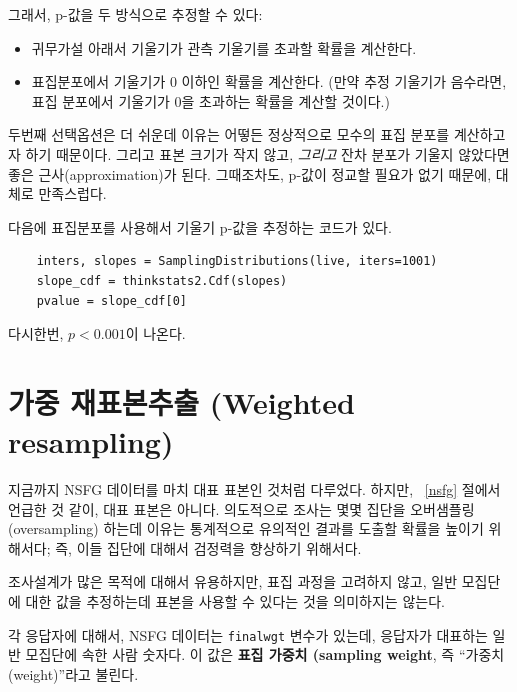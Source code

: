 그래서, p-값을 두 방식으로 추정할 수 있다:

\begin{itemize}

\item 귀무가설 아래서 기울기가 관측 기울기를 초과할 확률을 계산한다.

\item 표집분포에서 기울기가 0 이하인 확률을 계산한다. (만약 추정 기울기가 음수라면, 표집 분포에서 기울기가 0을 초과하는 확률을 계산할 것이다.)

\end{itemize}

두번째 선택옵션은 더 쉬운데 이유는 어떻든 정상적으로 모수의 표집 분포를 계산하고자 하기 때문이다. 그리고 표본 크기가 작지 않고, {\em 그리고} 잔차 분포가 기울지 않았다면 좋은 근사(approximation)가 된다. 그때조차도, p-값이 정교할 필요가 없기 때문에, 대체로 만족스럽다.


다음에 표집분포를 사용해서 기울기 p-값을 추정하는 코드가 있다.

\begin{verbatim}
    inters, slopes = SamplingDistributions(live, iters=1001)
    slope_cdf = thinkstats2.Cdf(slopes)
    pvalue = slope_cdf[0]
\end{verbatim}

다시한번, $p < 0.001$이 나온다.  


\section{가중 재표본추출 (Weighted resampling)}
\label{weighted}

지금까지 NSFG 데이터를 마치 대표 표본인 것처럼 다루었다. 하지만, ~\ref{nsfg} 절에서 언급한 것 같이, 대표 표본은 아니다. 의도적으로 조사는 몇몇 집단을 오버샘플링(oversampling) 하는데 이유는 통계적으로 유의적인 결과를 도출할 확률을 높이기 위해서다; 즉, 이들 집단에 대해서 검정력을 향상하기 위해서다.

조사설계가 많은 목적에 대해서 유용하지만, 표집 과정을 고려하지 않고, 일반 모집단에 대한 값을 추정하는데 표본을 사용할 수 있다는 것을 의미하지는 않는다.

각 응답자에 대해서, NSFG 데이터는 {\tt finalwgt} 변수가 있는데, 응답자가 대표하는 일반 모집단에 속한 사람 숫자다. 이 값은 {\bf 표집 가중치 (sampling weight}, 즉 ``가중치 (weight)''라고 불린다.

